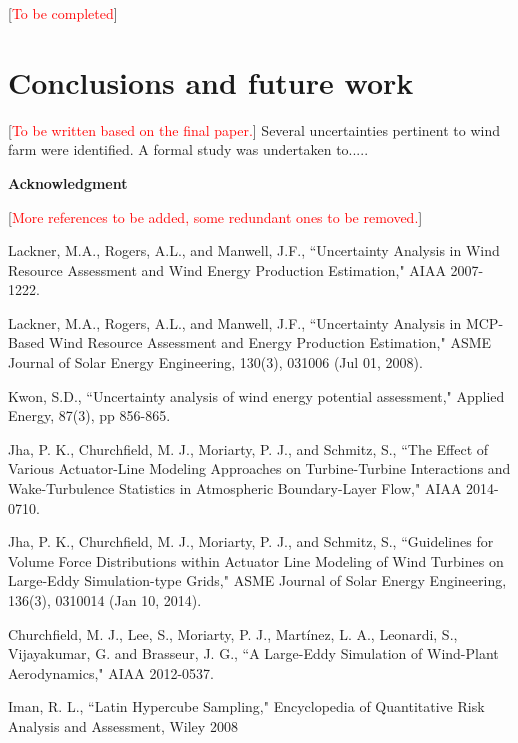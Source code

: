 \documentclass[]{aiaa-tc}%
\begin{document}
[\textcolor{red}{To be completed}]

\section{Conclusions and future work}
[\textcolor{red}{To be written based on the final paper.}]
Several uncertainties pertinent to wind farm were identified. A formal study was undertaken to.....



\textbf{Acknowledgment}

\begin{thebibliography}{9}%

[\textcolor{red}{More references to be added, some redundant ones to be removed.}]

Lackner, M.A., Rogers, A.L., and Manwell, J.F., ``Uncertainty Analysis in Wind Resource Assessment and Wind Energy Production Estimation," AIAA 2007-1222.

Lackner, M.A., Rogers, A.L., and Manwell, J.F., ``Uncertainty Analysis in MCP-Based Wind Resource Assessment and Energy Production Estimation," ASME Journal of Solar Energy Engineering, 130(3), 031006 (Jul 01, 2008).

Kwon, S.D., ``Uncertainty analysis of wind energy potential assessment," Applied Energy, 87(3), pp 856-865.

Jha, P. K., Churchfield, M. J., Moriarty, P. J., and Schmitz, S., ``The Effect of Various Actuator-Line   Modeling Approaches on Turbine-Turbine Interactions and Wake-Turbulence Statistics in Atmospheric Boundary-Layer Flow," AIAA 2014-0710.

Jha, P. K., Churchfield, M. J., Moriarty, P. J., and Schmitz, S., ``Guidelines for Volume Force  Distributions within Actuator Line Modeling of Wind Turbines on Large-Eddy Simulation-type Grids," ASME Journal of Solar Energy Engineering, 136(3), 0310014 (Jan 10, 2014).

Churchfield, M. J., Lee, S., Moriarty, P. J., Martínez, L. A., Leonardi, S., Vijayakumar, G. and  Brasseur, J. G., ``A Large-Eddy Simulation of Wind-Plant Aerodynamics," AIAA 2012-0537.

Iman, R. L., ``Latin Hypercube Sampling," Encyclopedia of Quantitative Risk Analysis and Assessment, Wiley 2008


\end{thebibliography}
\end{document}
